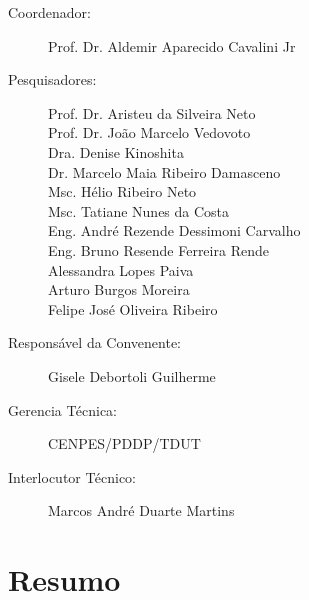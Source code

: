 \documentclass[12pt,fleqn,a4paper]{report}
\begin{document}
		\begin{normalsize}
			\begin{description}
				\vspace{20pt}
				\item[Coordenador:] Prof. Dr. Aldemir Aparecido Cavalini Jr 
				\item[\vspace{10pt}]  
		
				\item[Pesquisadores:] Prof. Dr. Aristeu da Silveira Neto \\
				\hspace*{1.95cm} Prof. Dr. João Marcelo Vedovoto \\
				\hspace*{1.95cm} Dra. Denise Kinoshita \\
				\hspace*{1.95cm} Dr. Marcelo Maia Ribeiro Damasceno \\
				\hspace*{1.95cm} Msc. Hélio Ribeiro Neto \\
				\hspace*{1.95cm} Msc. Tatiane Nunes da Costa \\
				\hspace*{1.95cm} Eng. André Rezende Dessimoni Carvalho \\
				\hspace*{1.95cm} Eng. Bruno Resende Ferreira Rende\\
				\hspace*{1.95cm} Alessandra Lopes Paiva\\
				\hspace*{1.95cm} Arturo Burgos Moreira\\
				\hspace*{1.95cm} Felipe José Oliveira Ribeiro\\
		
				\item[Responsável da Convenente:] Gisele Debortoli Guilherme
				 
				\item[Gerencia Técnica:] CENPES/PDDP/TDUT
				\item[Interlocutor Técnico:] Marcos André Duarte Martins
			\end{description}
		\end{normalsize}

		\newpage
	\section*{Resumo}
	
\end{document}
